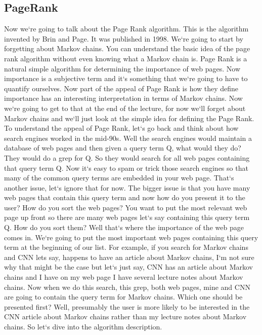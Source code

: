 \subsection{PageRank}
Now we`re going to talk about the Page Rank algorithm.
This is the algorithm invented by Brin and Page.
It was published in 1998.
We`re going to start by forgetting about Markov chains.
You can understand the basic idea of the page rank algorithm without even knowing what a Markov chain is.
Page Rank is a natural simple algorithm for determining the importance of web pages.
Now importance is a subjective term and it`s something that we`re going to have to quantify ourselves.
Now part of the appeal of Page Rank is how they define importance has an interesting interpretation in terms of Markov chains.
Now we`re going to get to that at the end of the lecture, for now we`ll forget about Markov chains and we`ll just look at the simple idea for defining the Page Rank.
To understand the appeal of Page Rank, let`s go back and think about how search engines worked in the mid-90s.
Well the search engines would maintain a database of web pages and then given a query term Q, what would they do? They would do a grep for Q\@.
So they would search for all web pages containing that query term Q\@.
Now it`s easy to spam or trick those search engines so that many of the common query terms are embedded in your web page.
That`s another issue, let`s ignore that for now.
The bigger issue is that you have many web pages that contain this query term and now how do you present it to the user? How do you sort the web pages? You want to put the most relevant web page up front so there are many web pages let`s say containing this query term Q\@.
How do you sort them? Well that`s where the importance of the web page comes in.
We`re going to put the most important web pages containing this query term at the beginning of our list.
For example, if you search for Markov chains and CNN lets say, happens to have an article about Markov chains, I`m not sure why that might be the case but let`s just say, CNN has an article about Markov chains and I have on my web page I have several lecture notes about Markov chains.
Now when we do this search, this grep, both web pages, mine and CNN are going to contain the query term for Markov chains.
Which one should be presented first? Well, presumably the user is more likely to be interested in the CNN article about Markov chains rather than my lecture notes about Markov chains.
So let`s dive into the algorithm description.


